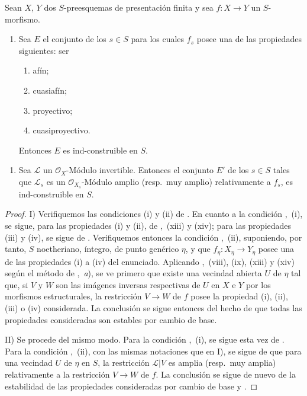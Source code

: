 \begin{proposition}[9.6.2]
\label{IV.9.6.2}
Sean $X$, $Y$ dos $S$-preesquemas de presentación finita y sea $f:X\to Y$ un $S$-morfismo.
\begin{enumerate}[label=\upshape{I)}]
  \item Sea $E$ el conjunto de los $s\in S$ para los cuales $f_s$ posee una de las propiedades siguientes: ser
  \begin{enumerate}[label=\textup{(\roman*)}]
    \item afín;
    \item cuasiafín;
    \item proyectivo;
    \item cuasiproyectivo.
  \end{enumerate}
  Entonces $E$ es ind-construible en $S$.
\end{enumerate}


\begin{enumerate}[label=\upshape{II)}]
  \item Sea $\mathcal L$ un $\mathcal O_X$-Módulo invertible.
  Entonces el conjunto $E'$ de los $s\in S$ tales que $\mathcal L_s$ es un $\mathcal O_{X_s}$-Módulo amplio \textup{(resp.}\ muy amplio\textup{)} relativamente a $f_s$, es ind-construible en $S$.
\end{enumerate}
\end{proposition}

\begin{proof}
I) Verifiquemos las condiciones (i) y (ii) de .
En cuanto a la condición ,~(i), se sigue, para las propiedades (i) y (ii), de ,~(xiii) y (xiv); para las propiedades (iii) y (iv), se sigue de .
Verifiquemos entonces la condición ,~(ii), suponiendo, por tanto, $S$ noetheriano, íntegro, de punto genérico $\eta$, y que $f_\eta:X_\eta\to Y_\eta$ posee una de las propiedades (i) a (iv) del enunciado.
Aplicando ,~(viii), (ix), (xiii) y (xiv) según el método de ,~\emph{a}), se ve primero que existe una vecindad abierta $U$ de $\eta$ tal que, si $V$ y $W$ son las imágenes inversas respectivas de $U$ en $X$ e $Y$ por los morfismos estructurales, la restricción $V\to W$ de $f$ posee la propiedad (i), (ii), (iii) o (iv) considerada.
La conclusión se sigue entonces del hecho de que todas las propiedades consideradas son estables por cambio de base.

II) Se procede del mismo modo.
Para la condición ,~(i), se sigue esta vez de .
Para la condición ,~(ii), con las mismas notaciones que en I), se sigue de  que para una vecindad $U$ de $\eta$ en $S$, la restricción $\mathcal L|V$ es amplia (resp.\ muy amplia) relativamente a la restricción $V\to W$ de $f$.
La conclusión se sigue de nuevo de la estabilidad de las propiedades consideradas por cambio de base  y .
\end{proof}

